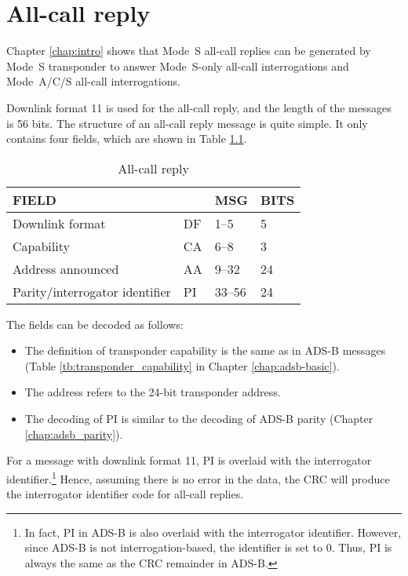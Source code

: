 \chapter{All-call reply}

Chapter \ref{chap:intro} shows that Mode~S all-call replies can be generated by Mode~S transponder to answer Mode~S-only all-call interrogations and Mode~A/C/S all-call interrogations.

Downlink format 11 is used for the all-call reply, and the length of the messages is 56 bits. The structure of an all-call reply message is quite simple. It only contains four fields, which are shown in Table \ref{tb:df11_structure}.

\begin{table}[ht]
\caption{All-call reply}
\label{tb:df11_structure}
\begin{tabular}{|l|l|l|l|}
\hline
\textbf{FIELD} & \textbf{} & \textbf{MSG} & \textbf{BITS} \\ \hline
Downlink format & DF & 1--5 & 5 \\ \hline
Capability & CA & 6--8 & 3 \\ \hline
Address announced & AA & 9--32 & 24 \\ \hline
Parity/interrogator identifier & PI & 33--56 & 24 \\ \hline
\end{tabular}
\end{table}

The fields can be decoded as follows:

\begin{itemize}
  \item The definition of transponder capability is the same as in ADS-B messages (Table \ref{tb:transponder_capability} in Chapter \ref{chap:adsb-basic}).

  \item The address refers to the 24-bit transponder address.

  \item The decoding of PI is similar to the decoding of ADS-B parity (Chapter \ref{chap:adsb_parity}). 
\end{itemize}

For a message with downlink format 11, PI is overlaid with the interrogator identifier.\footnote{In fact, PI in ADS-B is also overlaid with the interrogator identifier. However, since ADS-B is not interrogation-based, the identifier is set to 0. Thus, PI is always the same as the CRC remainder in ADS-B.} Hence, assuming there is no error in the data, the CRC will produce the interrogator identifier code for all-call replies.



